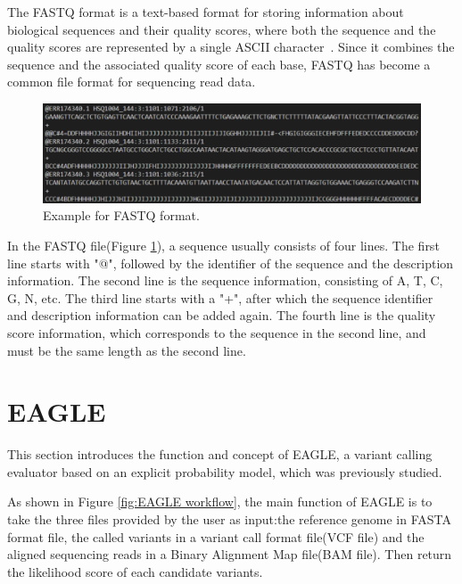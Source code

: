 \documentclass[PhD]{PHlab-thesis}
\begin{document}
The FASTQ format is a text-based format for storing information about biological sequences and their quality scores, where both the sequence and the quality scores are represented by a single ASCII character~\cite{Cock2010FASTQ}. Since it combines the sequence and the associated quality score of each base, FASTQ has become a common file format for sequencing read data.

\begin{figure}[h!]
	\centering
	\includegraphics[scale=0.3]{figures/Example for FASTQ format.png}
	\caption{Example for FASTQ format.}
	\label{fig:FASTQ format} %
\end{figure}

In the FASTQ file(Figure \ref{fig:FASTQ format}), a sequence usually consists of four lines. The first line starts with "@", followed by the identifier of the sequence and the description information. The second line is the sequence information, consisting of A, T, C, G, N, etc. The third line starts with a "+", after which the sequence identifier and description information can be added again. The fourth line is the quality score information, which corresponds to the sequence in the second line, and must be the same length as the second line.

\section{EAGLE}
This section introduces the function and concept of EAGLE, a variant calling evaluator based on an explicit probability model, which was previously studied.

As shown in Figure \ref{fig:EAGLE workflow}, the main function of EAGLE is to take the three files provided by the user as input:the reference genome in FASTA format file, the called variants in a variant call format file(VCF file) and the aligned sequencing reads in a Binary Alignment Map file(BAM file). Then return the likelihood score of each candidate variants.
\end{document}
